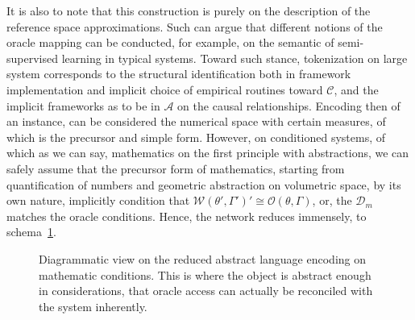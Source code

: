 It is also to note that this construction is purely on the description of the reference space approximations. Such can argue that different notions of the oracle mapping can be conducted, for example, on the semantic of semi-supervised learning in typical systems. Toward such stance, tokenization on large system corresponds to the structural identification both in framework implementation and implicit choice of empirical routines toward $\mathcal{C}$, and the implicit frameworks as to be in $\mathcal{A}$ on the causal relationships. Encoding then of an instance, can be considered the numerical space with certain measures, of which is the precursor and simple form. However, on conditioned systems, of which as we can  say, mathematics on the first principle with abstractions, we can safely assume that the precursor form of mathematics, starting from quantification of numbers and geometric abstraction on volumetric space, by its own nature, implicitly condition that $\mathcal{W}(\theta',\Gamma')'\cong\mathcal{O}(\theta,\Gamma)$, or, the $\mathcal{D}_{m}$ matches the oracle conditions. Hence, the network reduces immensely, to schema~\ref{diag:oracle_mathematics}. 
\begin{figure}[htb]
  \centering
  \caption{Diagrammatic view on the reduced abstract language encoding on mathematic conditions. This is where the object is abstract enough in considerations, that oracle access can actually be reconciled with the system inherently.}
  \label{diag:oracle_mathematics}
\end{figure}
